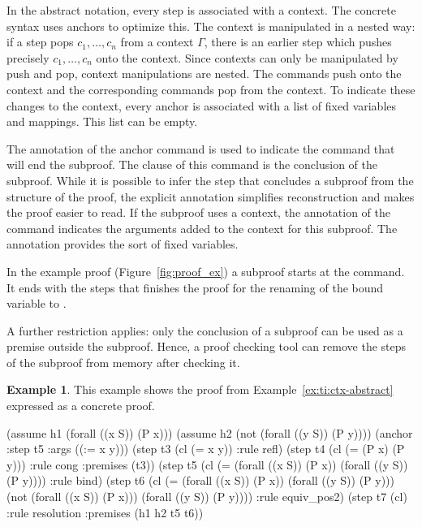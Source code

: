 \documentclass{scrartcl}
\newcommand{\ruleTypeImpl}[1]{%
  \microtypesetup{tracking=false}\textsf{#1}\microtypesetup{tracking=true}%
}
\def\proofRule#1{\hyperref[rule:\detokenize{#1}]{\ruleTypeImpl{\detokenize{#1}}}} %
\theoremstyle{definition}
\newtheorem{example}{Example}
\begin{document}
In the abstract notation, every step is associated with a context.  The
concrete syntax uses anchors to optimize this.
The context is manipulated in a nested way: if a step
pops $c_1,\dots, c_n$ from a context $\Gamma$, there is an earlier step which
pushes precisely $c_1,\dots, c_n$ onto the context.
%
Since contexts can only be manipulated by push and pop, context manipulations
are nested.  The  commands push onto the context and the
corresponding  commands pop from the context.
To indicate these changes to the context, every anchor is associated with a list
of fixed variables and mappings.
This list can be empty.

The  annotation of the anchor command is used to indicate the 
command that will end the subproof.  The clause of this 
command is the conclusion of the subproof.   While it is possible to infer the
step that concludes a subproof from the structure of the proof, the explicit
annotation simplifies reconstruction and makes the proof easier to read.
If the subproof uses a
context, the  annotation of the  command
indicates the arguments added to the context for this subproof.  The
annotation provides the sort of fixed variables.

In the example proof (Figure~\ref{fig:proof_ex}) a
subproof starts at the  command.
It ends with the \proofRule{bind} steps that finishes the
proof for the renaming of the bound variable 
to .

A further restriction applies: only the conclusion of a subproof can be used
as a premise outside the subproof. Hence, a proof checking tool can
remove the steps of the subproof from memory after checking it.

\begin{example}
\label{ex:ti:ctx-concrete}
This example shows the proof from Example~\ref{ex:ti:ctx-abstract}
expressed as a concrete proof.

\begin{AletheVerb}
(assume h1 (forall ((x S)) (P x)))
(assume h2 (not (forall ((y S)) (P y))))
(anchor :step t5 :args ((:= x y)))
(step t3 (cl (= x y)) :rule refl)
(step t4 (cl (= (P x) (P y))) :rule cong :premises (t3))
(step t5 (cl (= (forall ((x S)) (P x)) (forall ((y S)) (P y))))
                              :rule bind)
(step t6 (cl (= (forall ((x S)) (P x)) (forall ((y S)) (P y)))
             (not (forall ((x S)) (P x)))
             (forall ((y S)) (P y)))) :rule equiv_pos2)
(step t7 (cl) :rule resolution :premises (h1 h2 t5 t6))
\end{AletheVerb}
\end{example}
\end{document}
